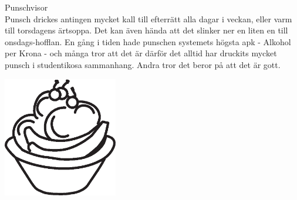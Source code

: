 \begin{flushleft}
{\Huge Punschvisor\\}
\vspace{1cm}
\Large{
Punsch drickes antingen mycket kall till efterrätt alla dagar i veckan,
eller varm till torsdagens ärtsoppa. Det kan även hända att det
slinker ner en liten en till onsdags-hofflan. En gång i tiden hade
punschen systemets högsta apk - Alkohol per Krona - och många tror att
det är därför det alltid har druckits mycket punsch i studentikosa
sammanhang. Andra tror det beror på att det är gott.}
\end{flushleft}
\vspace{2cm}
\begin{center}
\includegraphics[width=5cm]{bilder/47.eps}
\end{center}
\newpage



\newpage


\newpage




\newpage



\newpage


\newpage



\newpage


\newpage




